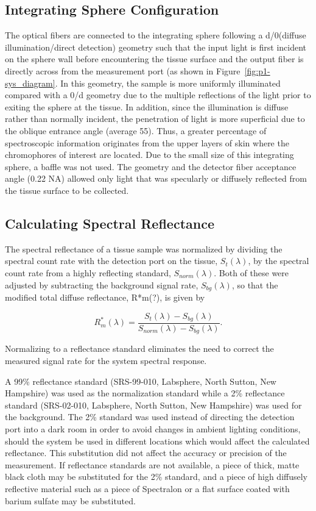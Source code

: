 \subsection{Integrating Sphere Configuration}
The optical fibers are connected to the integrating sphere following a d/0\degree (diffuse illumination/direct detection) geometry such that the input light is first incident on the sphere wall before encountering the tissue surface and the output fiber is directly across from the measurement port (as shown in Figure~\ref{fig:p1-sys_diagram}. In this geometry, the sample is more uniformly illuminated compared with a 0\degree/d geometry due to the multiple reflections of the light prior to exiting the sphere at the tissue. In addition, since the illumination is diffuse rather than normally incident, the penetration of light is more superficial due to the oblique entrance angle (average 55\degree). Thus, a greater percentage of spectroscopic information originates from the upper layers of skin where the chromophores of interest are located. Due to the small size of this integrating sphere, a baffle was not used. The geometry and the detector fiber acceptance angle (0.22 NA) allowed only light that was specularly or diffusely reflected from the tissue surface to be collected.

\subsection{Calculating Spectral Reflectance}
The spectral reflectance of a tissue sample was normalized by dividing the spectral count rate with the detection port on the tissue, $S_t(\lambda)$, by the spectral count rate from a highly reflecting standard, $S_{norm}(\lambda)$. Both of these were adjusted by subtracting the background signal rate, $S_{bg}(\lambda)$, so that the modified total diffuse reflectance, R*m(?), is given by

\begin{equation}
	R_m^\ast(\lambda)=\frac{S_t(\lambda)-S_{bg}(\lambda)}{S_{norm}(\lambda)-S_{bg}(\lambda)}.
\end{equation}

Normalizing to a reflectance standard eliminates the need to correct the measured signal rate for the system spectral response.

A 99\% reflectance standard (SRS-99-010, Labsphere, North Sutton, New Hampshire) was used as the normalization standard while a 2\% reflectance standard (SRS-02-010, Labsphere, North Sutton, New Hampshire) was used for the background. The 2\% standard was used instead of directing the detection port into a dark room in order to avoid changes in ambient lighting conditions, should the system be used in different locations which would affect the calculated reflectance. This substitution did not affect the accuracy or precision of the measurement. If reflectance standards are not available, a piece of thick, matte black cloth may be substituted for the 2\% standard, and a piece of high diffusely reflective material such as a piece of Spectralon or a flat surface coated with barium sulfate may be substituted.

